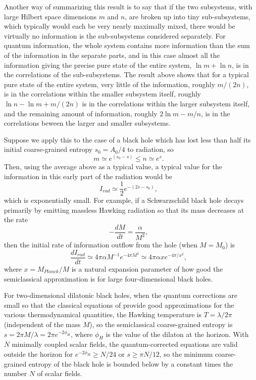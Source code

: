 	Another way of summarizing this result is to say that if the
two subsystems,
with large Hilbert space dimensions $m$ and $n$, are
broken up into tiny sub-subsystems, which typically would each be
very nearly
maximally mixed, there would be virtually no information is the
sub-subsystems
considered separately.  For quantum information, the whole system
contains more
information than the sum of the information in the separate parts,
and in this
case almost all the information giving the precise pure state of the
entire
system, $\ln m+\ln n$, is in the correlations of the sub-subsystems.
The
result above shows that for a typical pure state of the entire
system, very
little of the information, roughly $m/(2n)$, is in the correlations
within
the smaller subsystem itself, roughly $\ln n -\ln m +m/(2n)$ is in
the
correlations within the larger subsystem itself, and the remaining
amount of
information, roughly
$2\ln m -m/n$, is in the correlations beween the larger and
smaller subsystems.

	Suppose we apply this to the case of a black hole which has
lost less than
half its initial coarse-grained entropy $s_0=A_0/4$ to radiation, so
	\begin{equation}
	m\simeq e^{(s_0-s)}\leq n\simeq e^s.
	\end{equation}
Then, using the average above as a typical value, a typical value for
the
information in this early part of the radiation would be
	\begin{equation}
	I_{rad} \simeq \frac{1}{2}e^{-(2s-s_0)},
	\end{equation}
which is exponentially small.  For example, if a Schwarzschild black
hole
decays primarily by emitting massless Hawking radiation so that its
mass
decreases at the rate
	\begin{equation}
	-\frac{dM}{dt}=\frac{\alpha}{M^2},
	\end{equation}
then the initial rate of information outflow from the hole (when
$M=M_0$) is
	\begin{equation}
	\frac{dI_{rad}}{dt} \simeq 4\pi\alpha M^{-1}e^{-4\pi
M^2}\simeq 4\pi\alpha x
e^{-4\pi/x^2},
	\end{equation}
where $x=M_{Planck}/M$ is a natural expansion parameter of how good
the
semiclassical approximation is for large four-dimensional black
holes.

	For two-dimensional dilatonic black holes, when the quantum
corrections
are small so that the classical equations of \cite{CGHS} provide good
approximations for the various thermodynamical quantities, the
Hawking
temperature is $T = \lambda/2\pi$ (independent of the mass $M$), so
the
semiclassical coarse-grained entropy is $s=2\pi M/\lambda=2\pi
e^{-2\phi_H}$,
where $\phi_H$ is the value of the dilaton at the horizon.  With $N$
minimally
coupled scalar fields, the quantum-corrected equations \cite{CGHS}
are valid
outside the horizon for $e^{-2\phi_H}\geq N/24$ or $s\geq \pi N/12$,
so the
minimum coarse-grained entropy of the black hole is bounded below by
a
constant times the number $N$ of scalar fields.


